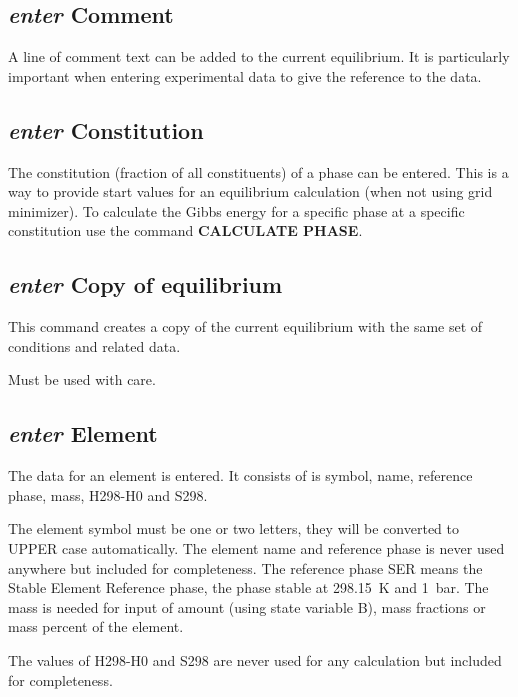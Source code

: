 \documentclass[11pt]{article}
\begin{document}
\hypertarget{Enter comment}{}
\subsection{{\em enter} Comment}

A line of comment text can be added to the current equilibrium.  It is
particularly important when entering experimental data to give the
reference to the data.

\hypertarget{Enter constitution}{}
\subsection{{\em enter} Constitution}

The constitution (fraction of all constituents) of a phase can be
entered.  This is a way to provide start values for an equilibrium
calculation (when not using grid minimizer).  To calculate the Gibbs
energy for a specific phase at a specific constitution use the command
{\bf CALCULATE PHASE}.

\hypertarget{Enter copyof}{}
\subsection{{\em enter} Copy of equilibrium}

This command creates a copy of the current equilibrium with the same
set of conditions and related data.

Must be used with care.

\hypertarget{Enter element}{}
\subsection{{\em enter} Element}

The data for an element is entered.  It consists of is symbol, name,
reference phase, mass, H298-H0 and S298.

The element symbol must be one or two letters, they will be converted
to UPPER case automatically.  The element name and reference phase is
never used anywhere but included for completeness.  The reference
phase SER means the Stable Element Reference phase, the phase stable
at 298.15~K and 1~bar.  The mass is needed for input of amount (using
state variable B), mass fractions or mass percent of the element.

The values of H298-H0 and S298 are never used for any calculation but
included for completeness.
\end{document}
